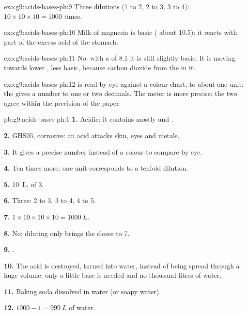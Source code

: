 \begin{solution}{exo:g9:acids-bases-ph:9}
Three dilutions (1 to 2, 2 to 3, 3 to 4): $10 \times 10 \times 10 =
1000$ times.
\end{solution}

\begin{solution}{exo:g9:acids-bases-ph:10}
Milk of magnesia is basic ( about 10.5): it reacts with part of the
excess acid of the stomach.
\end{solution}

\begin{solution}{exo:g9:acids-bases-ph:11}
No: with a  of 8.1 it is still slightly basic. It is moving towards
lower , less basic, because carbon dioxide from the   in
it.
\end{solution}

\begin{solution}{exo:g9:acids-bases-ph:12}
 is read by eye against a colour chart, to about one unit; the
 gives a number to one or two decimals. The meter is more
precise; the two agree within the precision of the paper.
\end{solution}

\begin{solution}{pb:g9:acids-bases-ph:1}
\textbf{1.} Acidic: it contains mostly  and 
.

\textbf{2.} GHS05, corrosive: an acid attacks skin, eyes and metals.

\textbf{3.} It gives a precise number instead of a colour to compare by
eye.

\textbf{4.} Ten times more: one  unit corresponds to a tenfold dilution.

\textbf{5.} \qty{10}{L}, of  3.

\textbf{6.} Three:  2 to 3, 3 to 4, 4 to 5.

\textbf{7.} $1 \times 10 \times 10 \times 10 = \qty{1000}{L}$.

\textbf{8.} No: diluting only brings the  closer to 7.

\textbf{9.} .

\textbf{10.} The acid is destroyed, turned into water, instead of being
spread through a huge volume; only a little base is needed and no
thousand litres of water.

\textbf{11.} Baking soda dissolved in water (or soapy water).

\textbf{12.} $1000 - 1 = \qty{999}{L}$ of water.
\end{solution}
